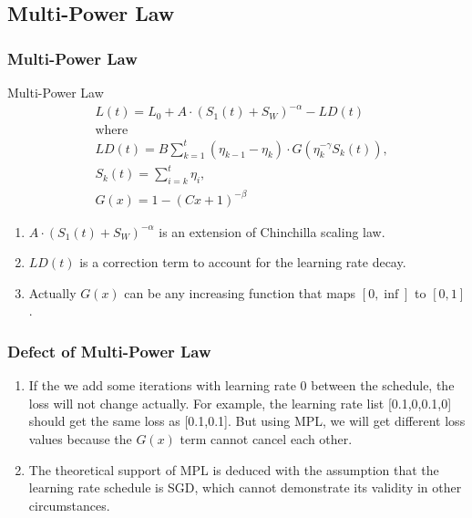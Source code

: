 \documentclass[aspectratio=169]{beamer}
\begin{document}
    \subsection{Multi-Power Law}\label{subsec:MPL}

    \begin{frame}
        \frametitle{Multi-Power Law}
        \begin{block}{Multi-Power Law}
            \begin{equation}
                \label{eq:multi_power_law}
                \begin{aligned}
                    &L(t) = L_0 + A\cdot (S_1(t) + S_W)^{-\alpha} - LD(t)\\
                    &\text{where} \\
                    & LD(t) = B\sum_{k=1}^{t}(\eta_{k-1}-\eta_k)\cdot
                    G(\eta_k^{-\gamma}S_k(t)), \\
                    &S_k(t) = \sum_{i=k}^{t} \eta_i, \\
                    &G(x) = 1-(Cx+1)^{-\beta}
                \end{aligned}
            \end{equation}
        \end{block}

        \begin{enumerate}
            \item $A\cdot (S_1(t) + S_W)^{-\alpha}$ is an extension of
            Chinchilla scaling law.
            \item $LD(t)$ is a correction term to account for the
            learning rate decay.
            \item Actually $G(x)$ can be any increasing function that
            maps $[0, \inf]$ to $[0, 1]$.
        \end{enumerate}
    \end{frame}

    \begin{frame}
        \frametitle{Defect of Multi-Power Law}
        \begin{enumerate}
            \item If the we add some iterations with learning rate 0 between the schedule, the loss will not change actually.
            For example, the learning rate list [0.1,0,0.1,0] should get the same loss as [0.1,0.1].
            But using MPL, we will get different loss values because the $G(x)$ term cannot cancel each other.
            \item The theoretical support of MPL is deduced with the assumption that the learning rate schedule is SGD,
            which cannot demonstrate its validity in other circumstances.
        \end{enumerate}
    \end{frame}
\end{document}
